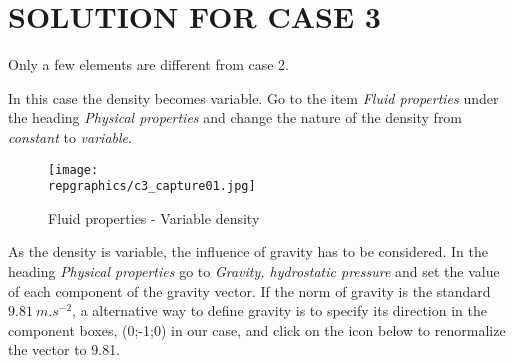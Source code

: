 %
% 
%
% 
% 
% 
%
\section{SOLUTION FOR CASE 3}

Only a few elements are different from case 2.

In this case the density becomes variable. Go to the item 
{\itshape Fluid properties} under the heading
{\itshape Physical properties} and change the nature of the density from 
{\itshape constant} to {\itshape variable}. 

\begin{figure}[h!]
\begin{center}
\texttt{[image: \\repgraphics/c3\_capture01.jpg]} 
\caption{Fluid properties - Variable density}
\label{fig1_e3}
\end{center}
\end{figure}


\newpage
As the density is variable, the influence of gravity has to be considered. In the
heading {\itshape Physical properties} go to
{\itshape Gravity, hydrostatic pressure} and set the value of each component of
the gravity vector. If the norm of gravity is the standard $9.81\ m.s^{-2}$, a
alternative way to define gravity is to specify its direction in the component
boxes, (0;-1;0) in our case, and click on the icon below to renormalize the
vector to 9.81.

